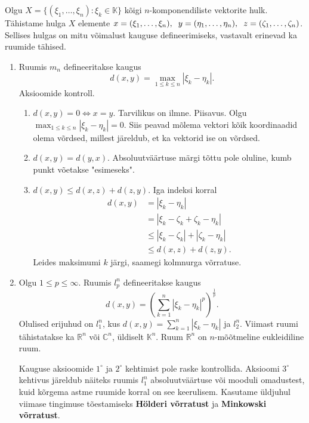 \documentclass{article}[12pt]
\newcommand{\h}{\hspace{0.2cm}}
\newcommand{\R}{\mathbb{R}}
\newcommand{\K}{\mathbb{K}}
\newcommand{\C}{\mathbb{C}}
\theoremstyle{definition}
\theoremstyle{definition}
\theoremstyle{definition}
\begin{document}
Olgu $X=\{(\xi_1,\dots,\xi_n): \xi_k\in\K\}$ kõigi $n$-komponendiliste vektorite hulk.
Tähistame hulga $X$ elemente $x=(\xi_1,\dots,\xi_n),\h y=(\eta_1,\dots,\eta_n),\h z=(\zeta_1,\dots,\zeta_n)$.
Sellises hulgas on mitu võimalust kauguse defineerimiseks, vastavalt erinevad ka ruumide tähised.
\begin{enumerate}
	\item Ruumis $m_n$ defineeritakse kaugus
	\[
		d(x,y) = \max_{1\leq k \leq n} |\xi_k-\eta_k|.
	\]
	Aksioomide kontroll.
	\begin{enumerate}
		\item $d(x,y) = 0 \Leftrightarrow x=y$.
		Tarvilikus on ilmne. 
		Piisavus. 
		Olgu $\max_{1\leq k \leq n} |\xi_k-\eta_k| = 0$. 
		Siis peavad mõlema vektori kõik koordinaadid olema võrdsed, millest järeldub, et ka vektorid ise on võrdsed.
		\item $d(x,y) = d(y,x)$.
		Absoluutväärtuse märgi tõttu pole oluline, kumb punkt võetakse "esimeseks".
		\item $d(x,y) \leq d(x,z) + d(z,y)$.
		Iga indeksi korral
		\begin{align*}
			d(x,y) &= |\xi_k-\eta_k| \\
			&= |\xi_k-\zeta_k+\zeta_k-\eta_k| \\
			&\leq |\xi_k-\zeta_k|+|\zeta_k-\eta_k| \\
			&\leq d(x,z) + d(z,y).
		\end{align*}
		Leides maksimumi $k$ järgi, saamegi kolmnurga võrratuse.
	\end{enumerate}
	\item Olgu $1\leq p \leq \infty$.
	Ruumis $l_p^n$ defineeritakse kaugus
	\[
		d(x,y) = \left( \sum_{k=1}^n |\xi_k - \eta_k|^p \right)^{\frac{1}{p}}.
	\]
	Olulised erijuhud on $l_1^n$, kus $d(x,y) = \sum_{k=1}^n |\xi_k-\eta_k|$ ja $l_2^n$.
	Viimast ruumi tähistatakse ka $\R^n$ või $\C^n$, üldiselt $\K^n$.
	Ruum $\R^n$ on $n$-mõõtmeline eukleidiline ruum.

	Kauguse aksioomide $1^\circ$ ja $2^\circ$ kehtimist pole raske kontrollida.
	Aksioomi $3^\circ$ kehtivus järeldub näiteks ruumis $l_1^n$ absoluutväärtuse või mooduli omadustest, kuid kõrgema astme ruumide korral on see keerulisem.
	Kasutame üldjuhul viimase tingimuse tõestamiseks \textbf{Hölderi võrratust} ja \textbf{Minkowski võrratust}.
\end{enumerate}
\end{document}
